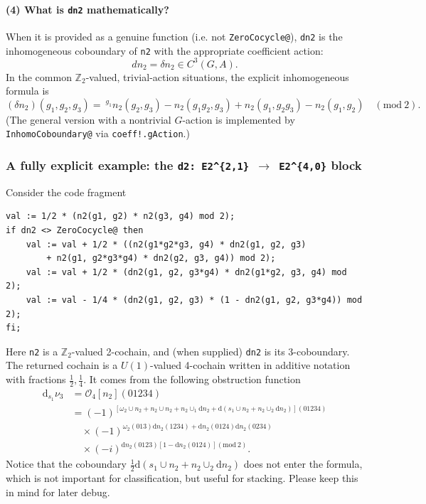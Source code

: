 \documentclass{SciPost}
\begin{document}
\paragraph{(4) What is \texttt{dn2} mathematically?}
When it is provided as a genuine function (i.e. not \texttt{ZeroCocycle@}), \texttt{dn2} is the inhomogeneous coboundary of \texttt{n2} with the appropriate coefficient action:
\begin{equation}
dn_2 = \delta n_2 \in C^3(G,A).
\end{equation}
In the common $\mathbb{Z}_2$-valued, trivial-action situations, the explicit inhomogeneous formula is
\begin{equation}
(\delta n_2)(g_1,g_2,g_3)
= ~ ^{g_1} n_2(g_2,g_3) - n_2(g_1 g_2, g_3) + n_2(g_1, g_2 g_3) - n_2(g_1,g_2)\quad (\mathrm{mod}\ 2).
\end{equation}
(The general version with a nontrivial $G$-action is implemented by \texttt{InhomoCoboundary@} via \texttt{coeff!.gAction}.)

\subsubsection{A fully explicit example: the \texttt{d2: E2\textasciicircum\{2,1\} $\to$ E2\textasciicircum\{4,0\}} block}
\label{subsec:d2-21-example}

Consider the code fragment
\begin{verbatim}
val := 1/2 * (n2(g1, g2) * n2(g3, g4) mod 2);
if dn2 <> ZeroCocycle@ then
    val := val + 1/2 * ((n2(g1*g2*g3, g4) * dn2(g1, g2, g3)
        + n2(g1, g2*g3*g4) * dn2(g2, g3, g4)) mod 2);
    val := val + 1/2 * (dn2(g1, g2, g3*g4) * dn2(g1*g2, g3, g4) mod 2);
    val := val - 1/4 * (dn2(g1, g2, g3) * (1 - dn2(g1, g2, g3*g4)) mod 2);
fi;
\end{verbatim}

Here \texttt{n2} is a $\mathbb{Z}_2$-valued 2-cochain, and (when supplied) \texttt{dn2} is its 3-coboundary.
The returned cochain is a $U(1)$-valued 4-cochain written in additive notation with fractions $\frac12,\frac14$.
It comes from the following obstruction function 
\begin{align}
\mathrm{d}_{s_1} \nu _{3} &=\mathcal{O}_{4}[ n_{2}]( 01234)\nonumber\\\nonumber
&=( -1)^{[ \omega _{2} \cup n_{2} +n_{2} \cup n_{2} +n_{2} \cup _{1}\mathrm{d} n_{2} +\mathrm{d}( s_{1} \cup n_{2} +n_{2} \cup _{2}\mathrm{d} n_{2})]( 01234)}\\\nonumber
&\quad\times ( -1)^{\omega _{2}( 013)\mathrm{d} n_{2}( 1234) +\mathrm{d} n_{2}( 0124)\mathrm{d} n_{2}( 0234)}\\
&\quad\times ( -i)^{\mathrm{d} n_{2}( 0123)[ 1-\mathrm{d} n_{2}( 0124)] (\mathrm{mod}\ 2)}
.
\end{align}
Notice that the coboundary $\frac{1}{2} \mathrm{d}( s_{1} \cup n_{2} +n_{2} \cup _{2}\mathrm{d} n_{2})$ does not enter the formula, which is not important for classification, but useful for stacking.
Please keep this in mind for later debug.
\end{document}
